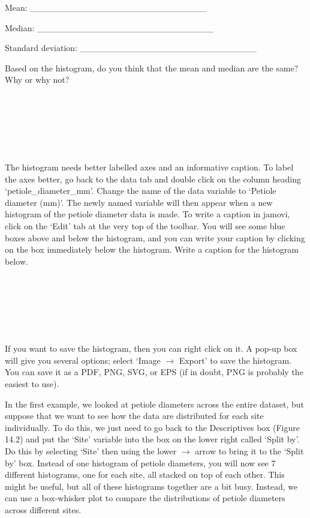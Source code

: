 \documentclass[
  openany]{krantz}
\begin{document}
Mean: \_\_\_\_\_\_\_\_\_\_\_\_\_\_\_\_\_\_\_\_\_\_\_\_\_\_\_\_

Median: \_\_\_\_\_\_\_\_\_\_\_\_\_\_\_\_\_\_\_\_\_\_\_\_\_\_\_\_

Standard deviation: \_\_\_\_\_\_\_\_\_\_\_\_\_\_\_\_\_\_\_\_\_\_\_\_\_\_\_\_

Based on the histogram, do you think that the mean and median are the same? Why or why not?

\begin{verbatim}






\end{verbatim}

The histogram needs better labelled axes and an informative caption.
To label the axes better, go back to the data tab and double click on the column heading `petiole\_diameter\_mm'.
Change the name of the data variable to `Petiole diameter (mm)'.
The newly named variable will then appear when a new histogram of the petiole diameter data is made.
To write a caption in jamovi, click on the `Edit' tab at the very top of the toolbar.
You will see some blue boxes above and below the histogram, and you can write your caption by clicking on the box immediately below the histogram.
Write a caption for the histogram below.

\begin{verbatim}






\end{verbatim}

If you want to save the histogram, then you can right click on it.
A pop-up box will give you several options; select `Image \(\to\) Export' to save the histogram.
You can save it as a PDF, PNG, SVG, or EPS (if in doubt, PNG is probably the easiest to use).

In the first example, we looked at petiole diameters across the entire dataset, but suppose that we want to see how the data are distributed for each site individually.
To do this, we just need to go back to the Descriptives box (Figure 14.2) and put the `Site' variable into the box on the lower right called `Split by'.
Do this by selecting `Site' then using the lower \(\to\) arrow to bring it to the `Split by' box.
Instead of one histogram of petiole diameters, you will now see 7 different histograms, one for each site, all stacked on top of each other.
This might be useful, but all of these histograms together are a bit busy.
Instead, we can use a box-whisker plot to compare the distributions of petiole diameters across different sites.
\end{document}
